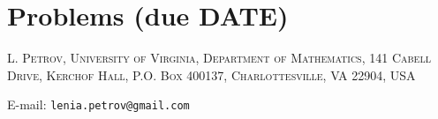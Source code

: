 \documentclass[letterpaper,11pt,oneside,reqno]{article}
\numberwithin{equation}{section}
\theoremstyle{definition}
\begin{document}
\appendix
\setcounter{section}{3}

\section{Problems (due DATE)}









\medskip

\textsc{L. Petrov, University of Virginia, Department of Mathematics, 141 Cabell Drive, Kerchof Hall, P.O. Box 400137, Charlottesville, VA 22904, USA}

E-mail: \texttt{lenia.petrov@gmail.com}
\end{document}
